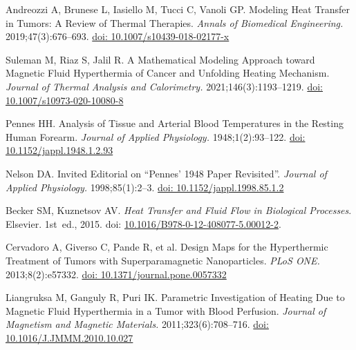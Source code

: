 \documentclass[Times1COL,AMA]{WileyNJDv5} %
\begin{document}
\begin{thebibliography}{10}
    Andreozzi A, Brunese L, Iasiello M, Tucci C, Vanoli GP. Modeling {{Heat
                    Transfer}} in {{Tumors}}: {{A Review}} of {{Thermal Therapies}}. {\it Annals
    of Biomedical Engineering.} 2019\string;47(3)\string:676--693.
    \newblock \href {\doibase 10.1007/s10439-018-02177-x} {doi:
        10.1007/s10439-018-02177-x}

    Suleman M, Riaz S, Jalil R. A Mathematical Modeling Approach toward Magnetic
    Fluid Hyperthermia of Cancer and Unfolding Heating Mechanism. {\it Journal of
            Thermal Analysis and Calorimetry.} 2021\string;146(3)\string:1193--1219.
    \newblock \href {\doibase 10.1007/s10973-020-10080-8} {doi:
        10.1007/s10973-020-10080-8}

    Pennes HH. Analysis of {{Tissue}} and {{Arterial Blood Temperatures}} in the
        {{Resting Human Forearm}}. {\it Journal of Applied Physiology.}
    1948\string;1(2)\string:93--122.
    \newblock \href {\doibase 10.1152/jappl.1948.1.2.93} {doi:
        10.1152/jappl.1948.1.2.93}

    Nelson DA. Invited {{Editorial}} on ``{{Pennes}}' 1948 Paper Revisited''. {\it
    Journal of Applied Physiology.} 1998\string;85(1)\string:2--3.
    \newblock \href {\doibase 10.1152/jappl.1998.85.1.2} {doi:
        10.1152/jappl.1998.85.1.2}

    Becker SM, Kuznetsov AV. {\it Heat {{Transfer}} and {{Fluid Flow}} in
                {{Biological Processes}}}.
    \newblock Elsevier.
    \newblock 1st~ed., 2015.
    \newblock doi:
    \href{https://doi.org/10.1016/B978-0-12-408077-5.00012-2}{10.1016/B978-0-12-408077-5.00012-2}.

    Cervadoro A, Giverso C, Pande R, et al. Design {{Maps}} for the {{Hyperthermic
                    Treatment}} of {{Tumors}} with {{Superparamagnetic Nanoparticles}}. {\it PLoS
    ONE.} 2013\string;8(2)\string:e57332.
    \newblock \href {\doibase 10.1371/journal.pone.0057332} {doi:
        10.1371/journal.pone.0057332}

    Liangruksa M, Ganguly R, Puri IK. Parametric Investigation of Heating Due to
    Magnetic Fluid Hyperthermia in a Tumor with Blood Perfusion. {\it Journal of
            Magnetism and Magnetic Materials.} 2011\string;323(6)\string:708--716.
    \newblock \href {\doibase 10.1016/J.JMMM.2010.10.027} {doi:
        10.1016/J.JMMM.2010.10.027}


\end{thebibliography}
\end{document}
